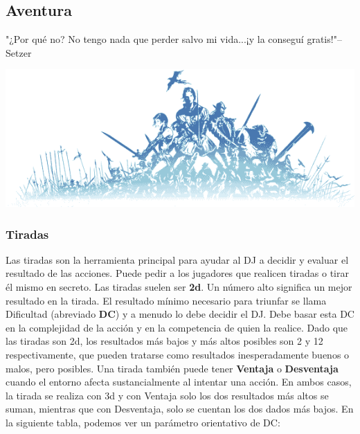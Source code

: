 \subsection*{\hypertarget{adv}{Aventura}}
"¿Por qué no? No tengo nada que perder salvo mi vida...\newline ¡y la conseguí gratis!"\indent – Setzer

\begin{center}
\includegraphics[width=\columnwidth]{./art/images/ff11.png} 
\end{center}

\vspace{0.1cm}

\subsubsection*{\hypertarget{check}{Tiradas}}
Las tiradas son la herramienta principal para ayudar al DJ a decidir y evaluar el resultado de las acciones. Puede pedir a los jugadores que realicen tiradas o tirar él mismo en secreto. Las tiradas suelen ser \textbf{2d}. Un número alto significa un mejor resultado en la tirada. El resultado mínimo necesario para triunfar se llama Dificultad (abreviado \textbf{DC}) y a menudo lo debe decidir el DJ. Debe basar esta DC en la complejidad de la acción y en la competencia de quien la realice. Dado que las tiradas son 2d, los resultados más bajos y más altos posibles son 2 y 12 respectivamente, que pueden tratarse como resultados inesperadamente buenos o malos, pero posibles. Una tirada también puede tener \textbf{Ventaja }o \textbf{Desventaja }cuando el entorno afecta sustancialmente al intentar una acción. En ambos casos, la tirada se realiza con 3d y con Ventaja solo los dos resultados más altos se suman, mientras que con Desventaja, solo se cuentan los dos dados más bajos. En la siguiente tabla, podemos ver un parámetro orientativo de DC:

\vfill

